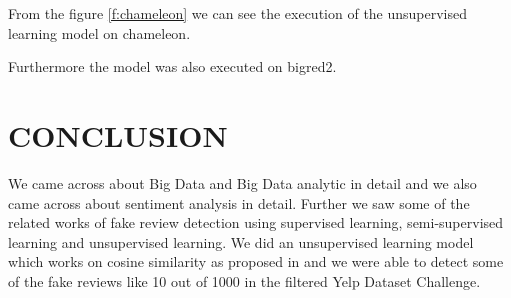 \documentclass[sigconf]{acmart}
\begin{document}
From the figure \ref{f:chameleon} we can see the execution of the unsupervised learning model on chameleon.

Furthermore the model was also executed on bigred2.
\section{CONCLUSION}

We came across about Big Data and Big Data analytic in detail and we also came across about sentiment analysis in detail. Further we saw some of the related works of fake review detection using supervised learning, semi-supervised learning and unsupervised learning. We did an unsupervised learning model which works on cosine similarity as proposed in \cite{originalPaper} and we were able to detect some of the fake reviews like 10 out of 1000 in the filtered Yelp Dataset Challenge. 



  
\end{document}
